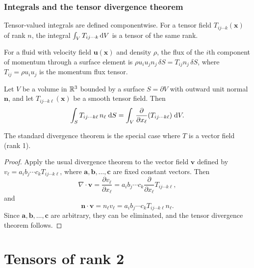 \documentclass[a4paper]{article}
\begin{document}
\subsubsection*{Integrals and the tensor divergence theorem}

\begin{defi}
  Tensor-valued integrals are defined componentwise. For a tensor field $T_{ij\cdots k}(\mathbf{x})$ of rank $n$, the integral $\int_V T_{ij\cdots k}\,\mathrm{d} V$ is a tensor of the same rank.
\end{defi}

\begin{eg}
  For a fluid with velocity field $\mathbf{u}(\mathbf{x})$ and density $\rho$, the flux of the $i$th component of momentum through a surface element is $\rho u_i u_j n_j \,\delta S = T_{ij}n_j \,\delta S$, where $T_{ij} = \rho u_iu_j$ is the momentum flux tensor.
\end{eg}

\begin{thm}
  Let $V$ be a volume in $\mathbb{R}^3$ bounded by a surface $S = \partial V$ with outward unit normal $\mathbf{n}$, and let $T_{ij\cdots k\ell}(\mathbf{x})$ be a smooth tensor field. Then
  \[
    \int_S T_{ij\cdots k\ell}\,n_\ell\;\mathrm{d} S = \int_V \frac{\partial}{\partial x_\ell}(T_{ij\cdots k\ell})\;\mathrm{d} V.
  \]
\end{thm}

\begin{rmk}
  The standard divergence theorem is the special case where $T$ is a vector field (rank 1).
\end{rmk}

\begin{proof}
  Apply the usual divergence theorem to the vector field $\mathbf{v}$ defined by $v_\ell = a_i b_j \cdots c_k T_{ij\cdots k\ell}$, where $\mathbf{a}, \mathbf{b}, \ldots, \mathbf{c}$ are fixed constant vectors. Then
  \[
    \nabla\cdot \mathbf{v} = \frac{\partial v_\ell}{\partial x_\ell} = a_i b_j \cdots c_k \frac{\partial}{\partial x_\ell}T_{ij\cdots k\ell},
  \]
  and
  \[
    \mathbf{n}\cdot \mathbf{v} = n_\ell v_\ell = a_i b_j \cdots c_k T_{ij\cdots k\ell }n_\ell.
  \]
  Since $\mathbf{a}, \mathbf{b}, \ldots, \mathbf{c}$ are arbitrary, they can be eliminated, and the tensor divergence theorem follows.
\end{proof}
\section{Tensors of rank 2}
\end{document}
